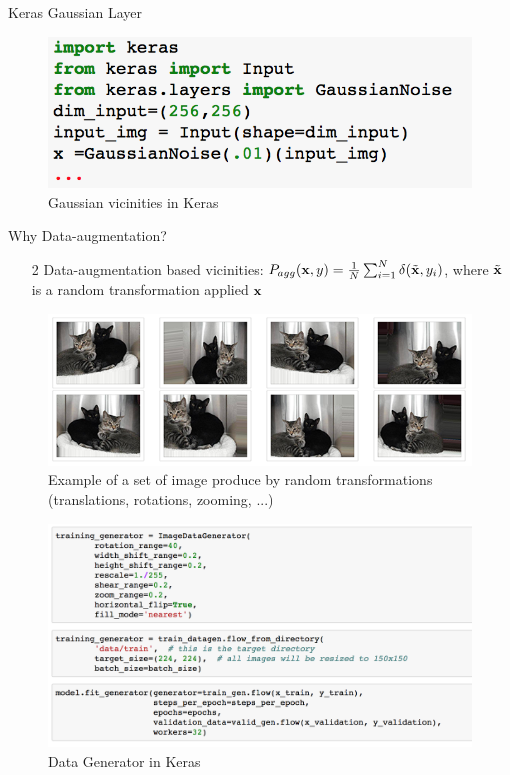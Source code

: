 \documentclass[handout,xcolor=pdftex,dvipsnames,table,mathserif]{beamer}
\begin{document}
\begin{frame}{Keras Gaussian Layer}
\begin{figure}
\includegraphics[width=.95 \columnwidth]{../graphics/GaussianNoiseLayer}
\caption{Gaussian vicinities in Keras}
\end{figure}
\end{frame}

\begin{frame}{Why Data-augmentation?}
\begin{enumerate}
\item[2]  Data-augmentation based vicinities: $P_{agg}(\mathbf{x},y) = \frac{1}{N}\sum_{i=1}^{N}\delta(\tilde{\mathbf{x}},y_i)$, where $\tilde{\mathbf{x}}$ is a random transformation applied $\mathbf{x}$
\end{enumerate}
\begin{figure}
\includegraphics[width=.99 \columnwidth]{../graphics/cat_data_augmentation}
\caption{Example of a set of image produce by random transformations (translations, rotations, zooming, ...)}
\end{figure}
\end{frame}

\begin{frame}
\begin{figure}
\includegraphics[width=.99 \columnwidth]{../graphics/DataGeneratorKeras}
\caption{Data Generator in Keras}
\end{figure}
\end{frame}
\end{document}
